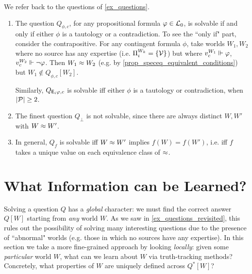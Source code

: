 \begin{example}
    \label{ex_questions_revisited}
    We refer back to the questions of \cref{ex_questions}.
    \begin{enumerate}
        \item The question $Q_{\phi, c}$, for any propositional formula $\varphi
              \in \mathcal{L}_0$, is solvable if and only if either $\phi$ is a
              tautology or a contradiction. To see the ``only if" part,
              consider the contrapositive. For any contingent formula $\phi$,
              take worlds $W_1, W_2$ where no source has any expertise (i.e.
              $\Pi^{W_k}_i = \{\mathcal{V}\}$) but where $v^{W_1}_c \Vdash
              \varphi$, $v^{W_2}_c \Vdash \neg\varphi$. Then $W_1 \approx W_2$
              (e.g. by \cref{prop_speceq_equivalent_conditions}) but $W_1
              \notin Q_{\phi, c}[W_2]$.

              Similarly, $Q_{\mathsf{E}_i\varphi, c}$ is solvable iff either $\phi$ is a
              tautology or contradiction, when $|\mathcal{P}| \ge 2$.

        \item The finest question $Q_\bot$ is not solvable, since there are
              always distinct $W, W'$ with $W \approx W'$.

        \item In general, $Q_f$ is solvable iff $W \approx W'$ implies $f(W) =
            f(W')$, i.e. iff $f$ takes a unique value on each equivalence class
            of $\approx$.
    \end{enumerate}
\end{example}

\section{What Information can be Learned?}
\label{sec_learning_info}

Solving a question $Q$ has a \emph{global} character: we must find the correct
answer $Q[W]$ starting from \emph{any} world $W$. As we saw in
\cref{ex_questions_revisited}, this rules out the possibility of solving many
interesting questions due to the presence of ``abnormal" worlds (e.g. those in
which no sources have any expertise). In this section we take a more
fine-grained approach by looking \emph{locally}: given some \emph{particular}
world $W$, what can we learn about $W$ via truth-tracking methods?
Concretely, what properties of $W$ are uniquely defined across $Q^*[W]$?

